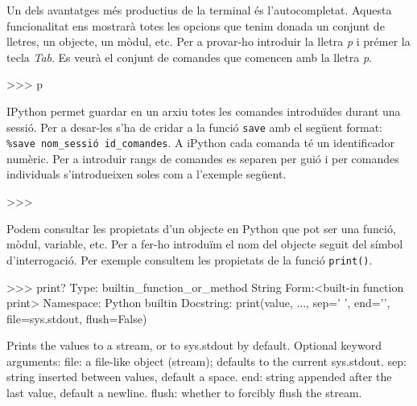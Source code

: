 Un dels avantatges més productius de la terminal és l'autocompletat. Aquesta funcionalitat ens mostrarà totes les opcions que tenim donada un conjunt de lletres, un objecte, un mòdul, etc. Per a provar-ho introduir la lletra \emph{p} i prémer la tecla \emph{Tab}. Es veurà el conjunt de comandes que comencen amb la lletra \emph{p}.



\begin{blockcode}
>>> p
\end{blockcode}




IPython permet guardar en un arxiu totes les comandes introduïdes durant una sessió. Per a desar-les s'ha de cridar a la funció {\tt save} amb el següent format: {\tt \%save nom\_sessió id\_comandes}. A iPython cada comanda té un identificador numèric. Per a introduir rangs de comandes es separen per guió i per comandes individuals s'introdueixen soles com a l'exemple següent.

\begin{blockcode}
>>> %
\end{blockcode}



Podem consultar les propietats d'un objecte en Python que pot ser una funció, mòdul, variable, etc. Per a fer-ho introduïm el nom del objecte seguit del símbol d'interrogació. Per exemple consultem les propietats de la funció {\tt print()}.

\begin{blockcode}
>>> print?
Type:       builtin_function_or_method
String Form:<built-in function print>
Namespace:  Python builtin
Docstring:
print(value, ..., sep=' ', end='\n', file=sys.stdout, 
flush=False)

Prints the values to a stream, or to sys.stdout by default.
Optional keyword arguments:
file:  a file-like object (stream); defaults to the current 
sys.stdout.
sep:   string inserted between values, default a space.
end:   string appended after the last value, default a newline.
flush: whether to forcibly flush the stream.
\end{blockcode}

